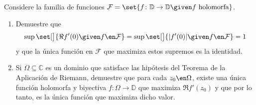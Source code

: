\setcounter{neje}{5}
\begin{nejer}
Considere la familia de funciones $\mathcal{F} = \set{f\colon \mathbb{D} \to \mathbb{D} \given f \text{ holomorfa}}$.
\begin{enumerate}[label=(\alph*),leftmargin=1.5em]
    \item Demuestre que
    \[ \sup\set[\big]{\Re f'(0) \given f \en \mathcal{F}} = \sup\set[\big]{|f'(0)| \given f \en \mathcal{F}} = 1 \]
    y que la única función en $\mathcal{F}$ que maximiza estos supremos es la identidad.\par
    [\textit{Sugerencia}: Problema 5 y Lema de Schwarz.]
    \item Si $\Omega \subseteq \mathbb{C}$ es un dominio que satisface las hipótesis del Teorema de la Aplicación de Riemann, demuestre que para cada $z_0 \en \Omega$, existe una única función holomorfa y biyectiva $f\colon \Omega \to \mathbb{D}$ que maximiza $\Re f'(z_0)$ y que por lo tanto, es la única función que maximiza dicho valor.\par
    [\textit{Sugerencia}: Teorema de la Aplicación de Riemann.]
\end{enumerate}
\end{nejer}
